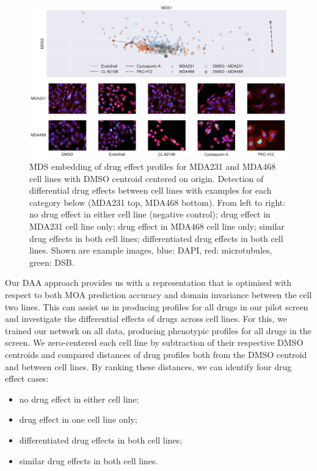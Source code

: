 \begin{figure}[htb]
\centering
  \includegraphics[width=\linewidth]{img/explot.pdf}
  \caption{MDS embedding of drug effect profiles for MDA231 and MDA468 cell lines with DMSO centroid centered on origin. Detection of differential drug effects between cell lines with examples for each category below (MDA231 top, MDA468 bottom). From left to right: no drug effect in either cell line (negative control); drug effect in MDA231 cell line only; drug effect in MDA468 cell line only; similar drug effects in both cell lines; differentiated drug effects in both cell lines. Shown are example images, blue: DAPI, red: microtubules, green: DSB.}
\label{fig:mds}
\end{figure}

Our DAA approach provides us with a representation that is optimised with respect to both MOA prediction accuracy and domain invariance between the cell two lines. This can assist us in producing profiles for all drugs in our pilot screen and investigate the differential effects of drugs across cell lines. For this, we trained our network on all data, producing phenotypic profiles for all drugs in the screen. We zero-centered each cell line by subtraction of their respective DMSO centroids and compared distances of drug profiles both from the DMSO centroid and between cell lines. By ranking these distances, we can identify four drug effect cases:

\begin{itemize}
\item no drug effect in either cell line;
\item drug effect in one cell line only;
\item differentiated drug effects in both cell lines;
\item similar drug effects in both cell lines.
\end{itemize}

